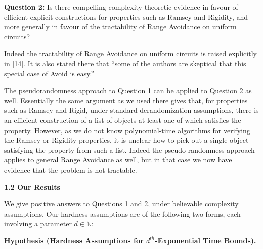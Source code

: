 \textbf{Question 2:} Is there compelling complexity-theoretic evidence in favour of efficient explicit constructions for properties such as Ramsey and Rigidity, and more generally in favour of the tractability of Range Avoidance on uniform circuits? 

Indeed the tractability of Range Avoidance on uniform circuits is raised explicitly in [14]. It is also stated there that “some of the authors are skeptical that this special case of Avoid is easy.”\par




The pseudorandomness approach to Question 1 can be applied to Question 2 as well. Essentially the same argument as we used there gives that, for properties such as Ramsey and Rigid, under standard derandomization assumptions, there is an efficient construction of a list of objects at least one of which satisfies the property. However, as we do not know polynomial-time algorithms for verifying the Ramsey or Rigidity properties, it is unclear how to pick out a single object satisfying the property from such a list. Indeed the pseudo-randomness approach applies to general Range Avoidance as well, but in that case we now have evidence that the problem is not tractable.\par






\par\medskip\noindent\textbf{
1.2 Our Results}\par




We give positive answers to Questions 1 and 2, under believable complexity assumptions. Our hardness assumptions are of the following two forms, each involving a parameter $d\in\mathbb{N}$:\par





\par\medskip\noindent\textbf{
\textbf{Hypothesis}\textbf{ }(Hardness Assumptions for $d^{th}$-Exponential Time Bounds)\textbf{.}
}\par



